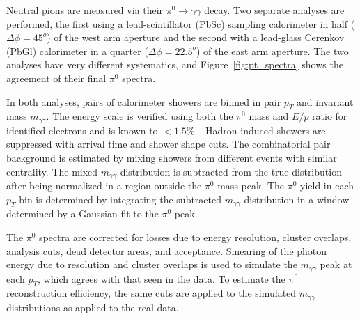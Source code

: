 \begin{multicols}{2}
%
%

%
%

Neutral pions are measured via their 
$\pi^0 \rightarrow \gamma \gamma$ decay. Two separate analyses 
are performed, the first using a lead-scintillator (PbSc) sampling 
calorimeter in half ($\Delta \phi = 45^{o}$) of the west arm 
aperture and the second with a lead-glass Cerenkov (PbGl) calorimeter 
in a quarter ($\Delta \phi = 22.5^{o}$) of the east arm aperture.
The two analyses have very different systematics, and 
Figure~\ref{fig:pt_spectra} shows the agreement of their 
final $\pi^{0}$ spectra.

In both analyses, pairs of calorimeter showers are  binned in 
pair $p_T$ and invariant mass $m_{\gamma \gamma}$. 
The energy scale is verified using both the $\pi^{0}$ mass and 
$E/p$ ratio for identified electrons and is 
known to $<1.5$\%~\cite{et}.  Hadron-induced showers are 
suppressed with arrival time and shower shape cuts. 
The combinatorial pair background is estimated by mixing showers 
from different events with similar centrality.  
The mixed $m_{\gamma \gamma}$ distribution is subtracted
from the true distribution after being normalized in a region 
outside the $\pi^0$ mass peak.  The $\pi^{0}$ yield in
each $p_{T}$ bin is determined by integrating the 
subtracted $m_{\gamma \gamma}$ distribution in a window
determined by a Gaussian fit to the $\pi^{0}$ peak.

The $\pi^0$ spectra are corrected for losses
due to energy resolution, cluster overlaps, analysis cuts, 
dead detector areas, and acceptance.  
%
%
Smearing of the photon energy due to resolution and 
cluster overlaps is used to simulate the $m_{\gamma \gamma}$
peak at each $p_{T}$, which agrees with that seen in the data.
To estimate the $\pi^0$ reconstruction efficiency,
the same cuts are applied to the simulated 
$m_{\gamma \gamma}$ distributions as applied to the real data.  


\end{multicols}
